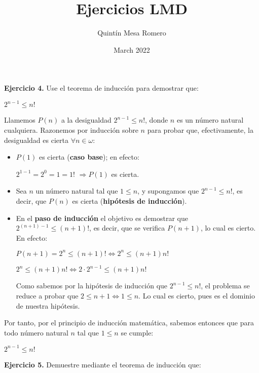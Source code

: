 \documentclass[a4papper, 11pt]{article}
\title{Ejercicios LMD}
\author{Quintín Mesa Romero }
\date{March 2022}
\begin{document}
\maketitle

\begin{flushleft}
	\textbf{Ejercicio 4.} Use el teorema de inducción para demostrar que: \newline
	
	\hfil $2^{n-1} \leq n!$ \newline
	
	Llamemos $P(n)$ a la desigualdad $2^{n-1} \leq n!$, donde $n$ es un número natural cualquiera. Razonemos por inducción sobre $n$ para probar que, efectivamente, la desigualdad es cierta $\forall n \in \omega$:
	
	\begin{itemize}
		\item $P(1)$ es cierta (\textbf{caso base}); en efecto:
		
		$2^{1-1} = 2^{0} = 1 = 1!$ $\Rightarrow P(1)$ es cierta.
		
		\item Sea $n$ un número natural tal que $1 \leq n$, y supongamos que $2^{n-1} \leq n!$, es decir, que $P(n)$ es cierta (\textbf{hipótesis de inducción}).
		
		\item En el \textbf{paso de inducción} el objetivo es demostrar que $2^{(n+1)-1} \leq (n+1)!$, es decir, que se verifica $P(n+1)$, lo cual es cierto. En efecto: 
		
		$P(n+1) = 2^{n} \leq (n+1)! \Leftrightarrow 2^{n} \leq (n+1)n!$
		
		$2^{n} \leq (n+1)n! \Leftrightarrow 2 \cdot 2^{n-1} \leq (n+1)n!$
		
		Como sabemos por la hipótesis de inducción que $2^{n-1} \leq n!$, el problema se reduce a probar que $2 \leq n+1 \Leftrightarrow 1 \leq n$. Lo cual es cierto, pues es el dominio de nuestra hipótesis. \newline
 
	\end{itemize}
	
	Por tanto, por el principio de inducción matemática, sabemos entonces que para todo número natural $n$ tal que $1 \leq n$ se cumple: \newline
	
	\hfil  $2^{n-1} \leq n!$ \newline
	
	\textbf{Ejercicio 5.} Demuestre mediante el teorema de inducción que: \newline
	

\end{flushleft}
\end{document}
